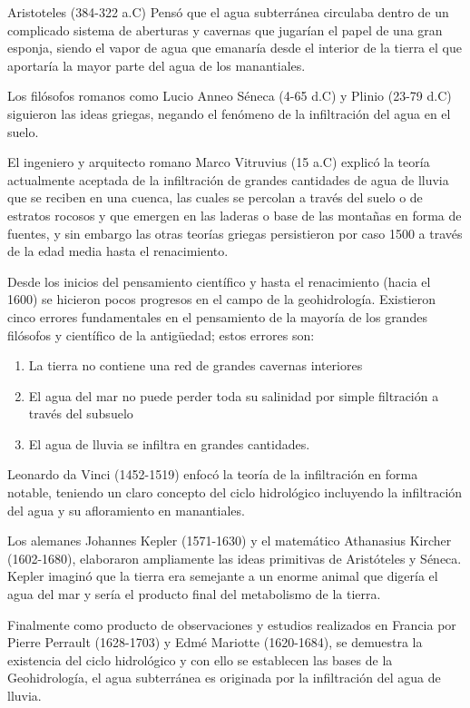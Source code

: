 Aristoteles (384-322 a.C) Pensó que el agua subterránea circulaba dentro de un complicado sistema de aberturas y cavernas que jugarían el papel de una gran esponja, siendo el vapor de agua que emanaría desde el interior de la tierra el que aportaría la mayor parte del agua de los manantiales.

Los filósofos romanos como Lucio Anneo Séneca (4-65 d.C) y Plinio (23-79 d.C) siguieron las ideas griegas, negando el fenómeno de la infiltración del agua en el suelo.

El ingeniero y arquitecto romano Marco Vitruvius (15 a.C) explicó la teoría actualmente aceptada de la infiltración de grandes cantidades de agua de lluvia que se reciben en una cuenca, las cuales se percolan a través del suelo o de estratos rocosos y que emergen en las laderas o base de las montañas en forma de fuentes, y sin embargo las otras teorías griegas persistieron por caso 1500 a través de la edad media hasta el renacimiento.

Desde los inicios del pensamiento científico y hasta el renacimiento (hacia el 1600) se hicieron pocos progresos en el campo de la geohidrología. Existieron cinco errores fundamentales en el pensamiento de la mayoría de los grandes filósofos y científico de la antigüedad; estos errores son:
\begin{enumerate}
    \item La tierra no contiene una red de grandes cavernas interiores
    \item El agua del mar no puede perder toda su salinidad por simple filtración a través del subsuelo
    \item El agua de lluvia se infiltra en grandes cantidades.
\end{enumerate}

Leonardo da Vinci (1452-1519) enfocó la teoría de la infiltración en forma notable, teniendo un claro concepto del ciclo hidrológico incluyendo la infiltración del agua y su afloramiento en manantiales.

Los alemanes Johannes Kepler (1571-1630) y el matemático Athanasius Kircher (1602-1680), elaboraron ampliamente las ideas primitivas de Aristóteles y Séneca. Kepler imaginó que la tierra era semejante a un enorme animal que digería el agua del mar y sería el producto final del metabolismo de la tierra.

Finalmente como producto de observaciones y estudios realizados en Francia por Pierre Perrault (1628-1703) y Edmé Mariotte (1620-1684), se demuestra la existencia del ciclo hidrológico y con ello se establecen las bases de la Geohidrología, el agua subterránea es originada por la infiltración del agua de lluvia.

